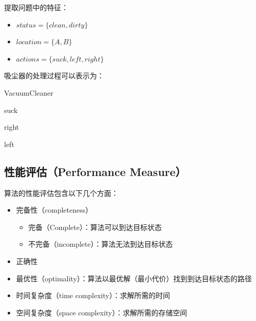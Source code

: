 提取问题中的特征：

\begin{itemize}
    \item $ status = \{clean, dirty\} $
    \item $ location = \{A, B\} $
    \item $ actions = \{suck, left, right\} $
\end{itemize}

吸尘器的处理过程可以表示为：

\begin{algorithm}[H]
    \caption{VacuumCleaner}
    \begin{algorithmic}[1]
        \State \Return suck
        \EndIf

        \State \Return right
        \EndIf

        \State \Return left
        \EndIf
        \EndProcedure
    \end{algorithmic}
\end{algorithm}

\vspace{0.5cm}

\subsection{性能评估（Performance Measure）}

算法的性能评估包含以下几个方面：

\begin{itemize}
    \item 完备性（completeness）
          \begin{itemize}
              \item 完备（Complete）：算法可以到达目标状态
              \item 不完备（incomplete）：算法无法到达目标状态
          \end{itemize}
    \item 正确性
    \item 最优性（optimality）：算法以最优解（最小代价）找到到达目标状态的路径
    \item 时间复杂度（time complexity）：求解所需的时间
    \item 空间复杂度（space complexity）：求解所需的存储空间
\end{itemize}

\newpage


